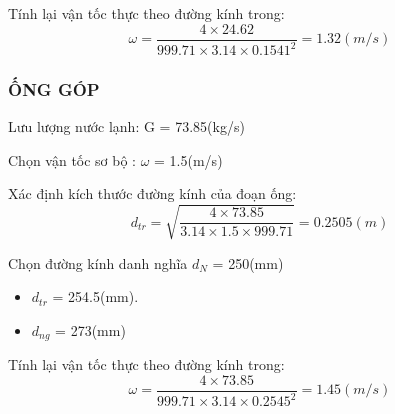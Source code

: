 Tính lại vận tốc thực theo đường kính trong:
\begin{equation*}
	\omega = \dfrac{4 \times 24.62 }{999.71 \times 3.14 \times 0.1541^{2}} = 1.32(m/s)
\end{equation*}

\subsubsection{ỐNG GÓP}

Lưu lượng nước lạnh: G = 73.85(kg/s)

Chọn vận tốc sơ bộ : $\omega$ = 1.5(m/s)

Xác định kích thước đường kính của đoạn ống:
\begin{equation*}
	d_{tr} = \sqrt{\dfrac{4 \times 73.85}{3.14 \times 1.5 \times 999.71}} =0.2505 (m)
\end{equation*}

Chọn đường kính danh nghĩa $d_{N}$ = 250(mm)
\begin{itemize}
	\item $d_{tr}$ = 254.5(mm).
	\item $d_{ng}$ = 273(mm)
\end{itemize}

Tính lại vận tốc thực theo đường kính trong:
\begin{equation*}
	\omega = \dfrac{4 \times 73.85 }{999.71 \times 3.14 \times 0.2545^{2}} = 1.45(m/s)
\end{equation*}